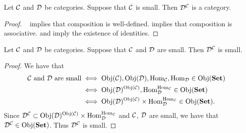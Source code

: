 \documentclass{book}
\begin{document}
	\begin{ex} 
		Let $\MC$ and $\MD$ be categories. Suppose that $\MC$ is small. Then $\MD^{\MC}$ is a category.
	\end{ex}

	\begin{proof}\
		 implies that composition is well-defined.  implies that composition is associative.  and  imply the existence of identities.  
	\end{proof}
	
	\begin{ex} 
		Let $\MC$ and $\MD$ be categories. Suppose that $\MC$ and $\MD$ are small. Then $\MD^{\MC}$ is small.
	\end{ex}
	
	\begin{proof}
		We have that 
		\begin{align*}
			\text{$\MC$ and $\MD$ are small}
			& \iff \Obj(\MC), \Obj(\MD), \Hom_{\MC}, \Hom_{\MD} \in \Obj(\bSet) \\
			& \iff \Obj(\MD)^{\Obj(\MC)}, \Hom_{\MD}^{\Hom_{\MC}} \in \Obj(\bSet) \\
			& \iff \Obj(\MD)^{\Obj(\MC)} \times \Hom_{\MD}^{\Hom_{\MC}} \in \Obj(\bSet).
		\end{align*}
		Since $\MD^{\MC} \subset \Obj(\MD)^{\Obj(\MC)} \times \Hom_{\MD}^{\Hom_{\MC}}$ and $\MC$, $\MD$ are small, we have that $\MD^{\MC} \in \Obj(\bSet)$. Thus $\MD^{\MC}$ is small.
	\end{proof}
	
	
	
	
	
	
	
	
	
	
	
	
	
	
	
	
	
	
	
	
	
	
	
	
	
	
	
	
	
	
	
	
	
	
	
	
	
\end{document}
